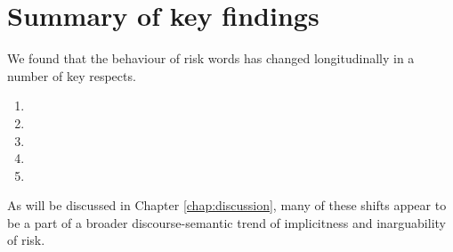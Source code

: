     \section{Summary of key findings}

    We found that the behaviour of risk words has changed longitudinally in a number of key respects.

    \begin{enumerate}
    \item 
    \item 
    \item 
    \item 
    \item 
    \end{enumerate}

    As will be discussed in Chapter \ref{chap:discussion}, many of these shifts appear to be a part of a broader discourse-semantic trend of implicitness and inarguability of risk. 


%

